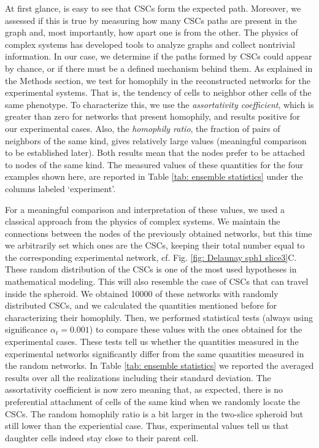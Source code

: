 \documentclass[fleqn,10pt]{wlscirep}
\begin{document}
At first glance, is easy to see that CSCs form the expected path. Moreover, we assessed if this is true by measuring how many CSCs paths are present in the graph and, most importantly, how apart one is from the other. The physics of complex systems has developed tools to analyze graphs and collect nontrivial information. In our case, we determine if the paths formed by CSCs could appear by chance, or if there must be a defined mechanism behind them. As explained in the Methods section, we test for homophily in the reconstructed networks for the experimental systems. That is, the tendency of cells to neighbor other cells of the same phenotype. To characterize this, we use the \emph{assortativity coefficient}, which is greater than zero for networks that present homophily, and results positive for our experimental cases. Also, the \emph{homophily ratio}, the fraction of pairs of neighbors of the same kind, gives relatively large values (meaningful comparison to be established later). Both results mean that the nodes prefer to be attached to nodes of the same kind. The measured values of these quantities for the four examples shown here, are reported in Table \ref{tab: ensemble statistics} under the columns labeled `experiment'.   

For a meaningful comparison and interpretation of these values, we used a classical approach from the physics of complex systems. We maintain the connections between the nodes of the previously obtained networks, but this time we arbitrarily set which ones are the CSCs, keeping their total number equal to the corresponding experimental network, cf. Fig. \ref{fig: Delaunay sph1 slice3}C. These random distribution of the CSCs is one of the most used hypotheses in mathematical modeling. This will also resemble the case of CSCs that can travel inside the spheroid. We obtained 10000 of these networks with randomly distributed CSCs, and we calculated the quantities mentioned before for characterizing their homophily. Then, we performed statistical tests (always using significance $\alpha_t=0.001$) to compare these values with the ones obtained for the experimental cases. These tests tell us whether the quantities measured in the experimental networks significantly differ from the same quantities measured in the random networks. In Table \ref{tab: ensemble statistics} we reported the averaged results over all the realizations including their standard deviation. The assortativity coefficient is now zero meaning that, as expected, there is no preferential attachment of cells of the same kind when we randomly locate the CSCs. The random homophily ratio is a bit larger in the two-slice spheroid but still lower than the experiential case. Thus, experimental values tell us that daughter cells indeed stay close to their parent cell. 
\end{document}

